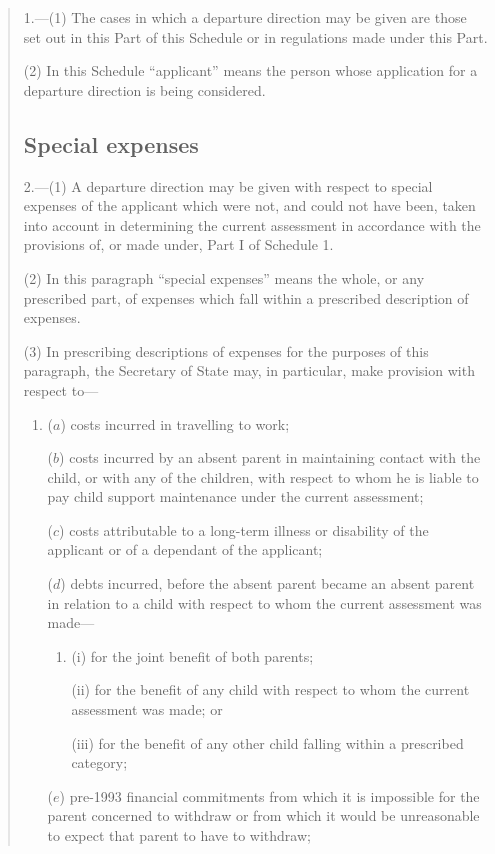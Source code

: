 \documentclass[a4paper]{article}
\begin{document}
{\begin{quotation}
1.---(1) The cases in which a departure direction may be given are those set out in this Part of this Schedule or in regulations made under this Part.

(2) In this Schedule “applicant” means the person whose application for a departure direction is being considered.

\subsection*{Special expenses}

2.---(1) A departure direction may be given with respect to special expenses of the applicant which were not, and could not have been, taken into account in determining the current assessment in accordance with the provisions of, or made under, Part I of Schedule 1.

(2) In this paragraph “special expenses” means the whole, or any prescribed part, of expenses which fall within a prescribed description of expenses.

(3) In prescribing descriptions of expenses for the purposes of this paragraph, the Secretary of State may, in particular, make provision with respect to—
\begin{enumerate}\item[]
($a$) costs incurred in travelling to work;

($b$) costs incurred by an absent parent in maintaining contact with the child, or with any of the children, with respect to whom he is liable to pay child support maintenance under the current assessment;

($c$) costs attributable to a long-term illness or disability of the applicant or of a dependant of the applicant;

($d$) debts incurred, before the absent parent became an absent parent in relation to a child with respect to whom the current assessment was made—
\begin{enumerate}\item[]
(i) for the joint benefit of both parents;

(ii) for the benefit of any child with respect to whom the current assessment was made; or

(iii) for the benefit of any other child falling within a prescribed category;
\end{enumerate}

($e$) pre-1993 financial commitments from which it is impossible for the parent concerned to withdraw or from which it would be unreasonable to expect that parent to have to withdraw;


\end{enumerate}
\end{quotation}}
\end{document}
